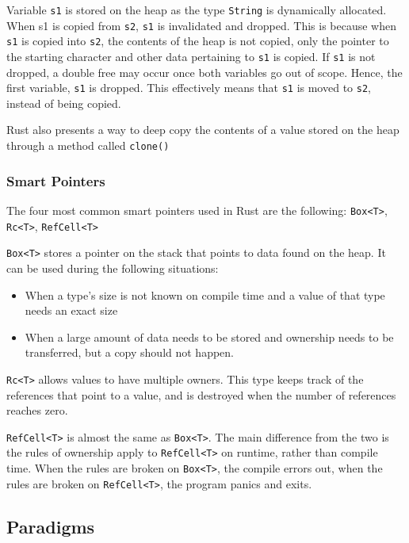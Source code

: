 \documentclass{article}
\newcommand{\rustin}[1]{\texttt{#1}}
\begin{document}
  Variable \rustin{s1} is stored on the heap as the type \rustin{String} is
  dynamically allocated. When s1 is copied from \rustin{s2}, \rustin{s1} is
  invalidated and dropped. This is because when \rustin{s1} is copied into
  \rustin{s2}, the contents of the heap is not copied, only the pointer to the
  starting character and other data pertaining to \rustin{s1} is copied. If
  \rustin{s1} is not dropped, a double free may occur once both variables go out
  of scope. Hence, the first variable, \rustin{s1} is dropped. This effectively
  means that \rustin{s1} is moved to \rustin{s2}, instead of being copied.

  Rust also presents a way to deep copy the contents of a value stored on the
  heap through a method called \rustin{clone()}

  \subsubsection{Smart Pointers}
  The four most common smart pointers used in Rust are the following:
  \rustin{Box<T>}, \rustin{Rc<T>}, \rustin{RefCell<T>}

  \rustin{Box<T>} stores a pointer on the stack that points to data found on the
  heap. It can be used during the following situations:
  \begin{itemize}
    \item When a type's size is not known on compile time and a value of that
          type needs an exact size
    \item When a large amount of data needs to be stored and ownership needs to
          be transferred, but a copy should not happen.
  \end{itemize}

  \rustin{Rc<T>} allows values to have multiple owners. This type keeps track of
  the references that point to a value, and is destroyed when the number of
  references reaches zero.

  \rustin{RefCell<T>} is almost the same as \rustin{Box<T>}. The main difference
  from the two is the rules of ownership apply to \rustin{RefCell<T>} on
  runtime, rather than compile time. When the rules are broken on
  \rustin{Box<T>}, the compile errors out, when the rules are broken on
  \rustin{RefCell<T>}, the program panics and exits.

  \subsection{Paradigms}
\end{document}
